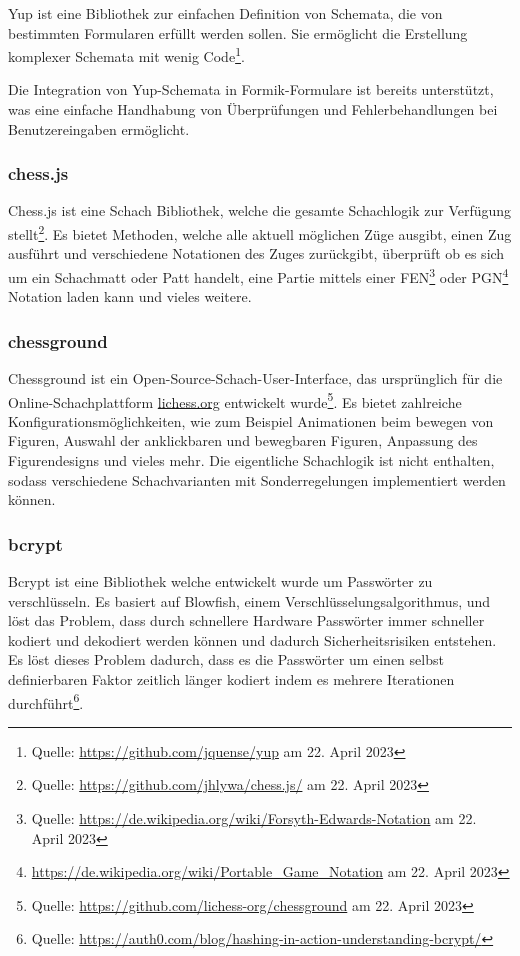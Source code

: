 \documentclass[a4paper,12pt]{report}
\begin{document}
Yup ist eine Bibliothek  zur einfachen Definition von Schemata, die von bestimmten Formularen erfüllt werden sollen. Sie ermöglicht die Erstellung komplexer Schemata mit wenig Code\footnote{Quelle: \url{https://github.com/jquense/yup} am 22. April 2023}.

Die Integration von Yup-Schemata in Formik-Formulare ist bereits unterstützt, was eine einfache Handhabung von Überprüfungen und Fehlerbehandlungen bei Benutzereingaben ermöglicht.

        \subsubsection{chess.js}
        \label{sec:chess.js}
Chess.js ist eine Schach Bibliothek, welche die gesamte Schachlogik zur Verfügung stellt\footnote{Quelle: \url{https://github.com/jhlywa/chess.js/} am 22. April 2023}. Es bietet Methoden, welche alle aktuell möglichen Züge ausgibt, einen Zug ausführt und verschiedene Notationen des Zuges zurückgibt, überprüft ob es sich um ein Schachmatt oder Patt handelt, eine Partie mittels einer FEN\footnote{Quelle: \url{https://de.wikipedia.org/wiki/Forsyth-Edwards-Notation} am 22. April 2023} oder PGN\footnote{\url{https://de.wikipedia.org/wiki/Portable_Game_Notation} am 22. April 2023} Notation laden kann und vieles weitere. 
        \subsubsection{chessground}
        \label{sec:chessground}
Chessground ist ein Open-Source-Schach-User-Interface, das ursprünglich für die Online-Schachplattform \url{lichess.org} entwickelt wurde\footnote{Quelle: \url{https://github.com/lichess-org/chessground} am 22. April 2023}. Es bietet zahlreiche Konfigurationsmöglichkeiten, wie zum Beispiel Animationen beim bewegen von Figuren, Auswahl der anklickbaren und bewegbaren Figuren, Anpassung des Figurendesigns und vieles mehr. Die eigentliche Schachlogik ist nicht enthalten, sodass verschiedene Schachvarianten mit Sonderregelungen implementiert werden können.

\subsubsection{bcrypt}
\label{sec:bcrypt}
Bcrypt ist eine Bibliothek welche entwickelt wurde um Passwörter zu verschlüsseln. Es basiert auf Blowfish, einem Verschlüsselungsalgorithmus, und löst das Problem, dass durch schnellere Hardware Passwörter immer schneller kodiert und dekodiert werden können und dadurch Sicherheitsrisiken entstehen. Es löst dieses Problem dadurch, dass es die Passwörter um einen selbst definierbaren Faktor zeitlich länger kodiert indem es mehrere Iterationen durchführt\footnote{Quelle: \url{https://auth0.com/blog/hashing-in-action-understanding-bcrypt/}}.
        
\end{document}
